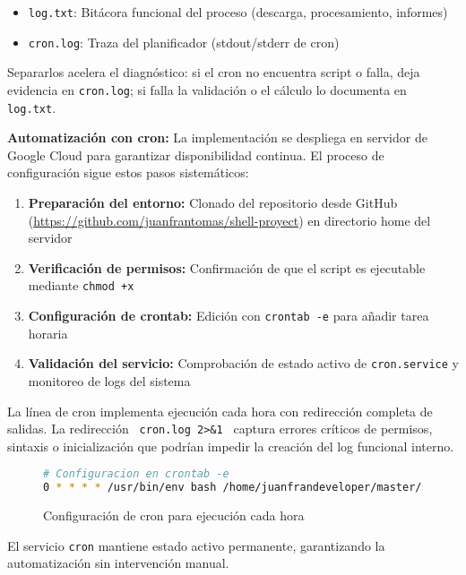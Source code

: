 \begin{itemize}[noitemsep]
  \item \texttt{log.txt}: Bitácora funcional del proceso (descarga, procesamiento, informes)
  \item \texttt{cron.log}: Traza del planificador (stdout/stderr de cron)
\end{itemize}

Separarlos acelera el diagnóstico: si el cron no encuentra script o falla, deja evidencia en \texttt{cron.log}; si falla la validación o el cálculo lo documenta en \texttt{log.txt}.

\textbf{Automatización con cron:} La implementación se despliega en servidor de Google Cloud para garantizar disponibilidad continua. El proceso de configuración sigue estos pasos sistemáticos:

\begin{enumerate}[noitemsep]
  \item \textbf{Preparación del entorno:} Clonado del repositorio desde GitHub (\url{https://github.com/juanfrantomas/shell-proyect}) en directorio home del servidor
  \item \textbf{Verificación de permisos:} Confirmación de que el script es ejecutable mediante \texttt{chmod +x}
  \item \textbf{Configuración de crontab:} Edición con \texttt{crontab -e} para añadir tarea horaria
  \item \textbf{Validación del servicio:} Comprobación de estado activo de \texttt{cron.service} y monitoreo de logs del sistema
\end{enumerate}

La línea de cron implementa ejecución cada hora con redirección completa de salidas. La redirección  \texttt{ cron.log 2>\&1 } captura errores críticos de permisos, sintaxis o inicialización que podrían impedir la creación del log funcional interno.

\begin{figure}[H]
  \footnotesize
  \begin{lstlisting}[language=bash]
# Configuracion en crontab -e
0 * * * * /usr/bin/env bash /home/juanfrandeveloper/master/shell-proyect/analisis_json.sh >> /home/juanfrandeveloper/master/shell-proyect/cron.log 2>&1
\end{lstlisting}
  \caption{Configuración de cron para ejecución cada hora}
\end{figure}

El servicio \texttt{cron} mantiene estado activo permanente, garantizando la automatización sin intervención manual.

